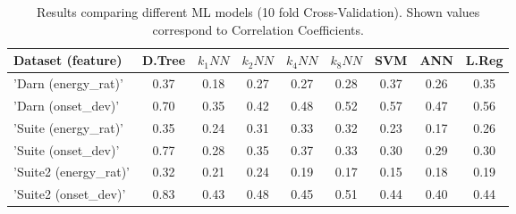 \begin{table}
\centering
\caption[Results comparing different ML models (10 fold Cross-Validation)]{Results comparing different ML models (10 fold Cross-Validation). Shown values correspond to Correlation Coefficients.}
\label{tab:results_ml_cv}
\footnotesize
\begin{tabular} {lcccccccc}
\\ \hline
Dataset (feature) & D.Tree& $k_1NN$ & $k_2NN$ & $k_4NN$ & $k_8NN$ & SVM & ANN & L.Reg \\ \hline
'Darn (energy\_rat)' & 0.37 & 0.18 &  0.27 & 0.27 &  0.28 &  0.37 & 0.26 & 0.35 \\
'Darn (onset\_dev)' & 0.70 & 0.35 &  0.42 & 0.48 & 0.52 & 0.57 & 0.47 & 0.56  \\
'Suite (energy\_rat)' & 0.35 & 0.24 & 0.31 & 0.33 & 0.32 &  0.23 &  0.17 & 0.26 \\
'Suite (onset\_dev)' & 0.77 & 0.28 & 0.35 & 0.37 & 0.33 & 0.30 & 0.29 & 0.30 \\
'Suite2 (energy\_rat)' & 0.32 & 0.21 & 0.24 & 0.19 & 0.17 & 0.15 & 0.18 & 0.19 \\
'Suite2 (onset\_dev)' & 0.83 & 0.43 & 0.48 & 0.45 & 0.51 & 0.44 & 0.40 & 0.44 \\
\hline
\end{tabular} 
\footnotesize

\end{table}
